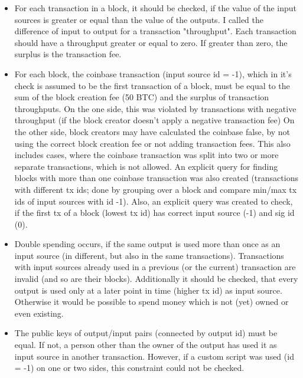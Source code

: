 \documentclass[12pt,a4paper]{article}
\begin{document}
\begin{itemize}
\item For each transaction in a block, it should be checked, if the value of the
input sources is greater or equal than the value of the outputs. I called the difference of input to output for a transaction "throughput".
Each transaction should have a throughput greater or equal to zero. If greater than zero, the surplus is the transaction fee.\newline
\item For each block, the coinbase transaction (input source id = -1), which in it's check is assumed to be the first transaction of a block, must be equal to the sum of the block creation fee (50 BTC)
and the surplus of transaction throughputs.\newline
On the one side, this was violated by transactions with negative throughput (if the block creator doesn't apply a negative transaction fee)\newline
On the other side, block creators may have calculated the coinbase false, by not using the correct block creation fee or not adding transaction fees. This also includes cases, where the coinbase transaction was
split into two or more separate transactions, which is not allowed.
An explicit query for finding blocks with more than one coinbase transaction was also created (transactions with different tx ids; done by grouping over a block and compare min/max tx ids of input sources with id -1).\newline
Also, an explicit query was created to check, if the first tx of a block (lowest tx id) has correct input source (-1) and sig id (0).
\item Double spending occurs, if the same output is used more than once as an input source (in different, but also in the same transactions). Transactions with input sources already
used in a previous (or the current) transaction are invalid (and so are their blocks).\newline
Additionally it should be checked, that every output is used only at a later point in time (higher tx id) as input source.
Otherwise it would be possible to spend money which is not (yet) owned or even existing.\newline
\item The public keys of output/input pairs (connected by output id) must be equal. If not, a person other than the owner of the output has used it as
input source in another transaction. However, if a custom script was used (id = -1) on one or two sides, this constraint could not be checked.\newline

\end{itemize}
\end{document}
